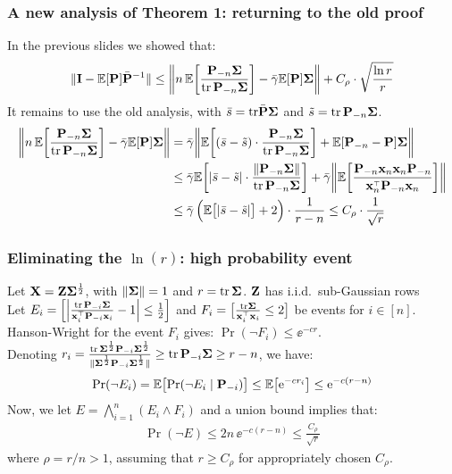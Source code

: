 \documentclass[10pt]{beamer}
\begin{document}
\begin{frame}
  \frametitle{A new analysis of Theorem 1: returning to the old proof}
  In the previous slides we showed that:
  \begin{align*}
    \|\mathbf I-\mathbb E[\mathbf P]\bar{\mathbf P}^{-1}\|\leq
    \bigg\|n\,\mathbb E\bigg[\frac{\mathbf P_{-n}\mathbf{\Sigma}}{\mathrm{tr}\,\mathbf P_{-n}\mathbf{\Sigma}}\bigg]
    - \bar\gamma\mathbb E[\mathbf P]\mathbf{\Sigma}\bigg\| + C_\rho\cdot \sqrt{\frac{\ln r}{r}}
  \end{align*}
  It remains to use the old analysis, with $\bar s=\mathrm{tr}\bar{\mathbf P}\mathbf{\Sigma}$
  and $\tilde s=\mathrm{tr}\,\mathbf P_{-n}\mathbf{\Sigma}$.
  \begin{align*}
   \bigg\| n\,\E\bigg[\frac{\P_{-n}\Sigmab}{\tr\,\P_{-n}\Sigmab}\bigg]
    - \bar\gamma\E[\P]\Sigmab\bigg\|
&=\bar\gamma\bigg\|\E\bigg[(\bar s - \tilde s)\cdot
\frac{\P_{-n}\Sigmab}{\tr\,\P_{-n}\Sigmab}\bigg]
+ \E[\P_{-n}-\P]\Sigmab\bigg\|\\
&\leq \bar\gamma \E\bigg[|\bar s-\tilde s|\cdot
\frac{\|\P_{-n}\Sigmab\|}{\tr\,\P_{-n}\Sigmab}\bigg]
+\bar\gamma\bigg\|\E\bigg[\frac{\P_{-n}\x_n\x_n\P_{-n}}{\x_n^\top\P_{-n}\x_n}\bigg]\bigg\|
    \\
    &\leq \bar\gamma\,\Big(\E\big[|\bar s-\tilde s|\big] + 2\Big)\cdot
      \frac1{r-n}\leq C_\rho\cdot \frac1{\sqrt r}
  \end{align*}
\end{frame}

  \begin{frame}
    \frametitle{Eliminating the $\ln(r)$: high probability event}
Let $\mathbf X = \mathbf Z\mathbf{\Sigma}^{\frac12}$, with $\|\mathbf{\Sigma}\|=1$ and
$r=\mathrm{tr}\,\mathbf{\Sigma}$. $\mathbf Z$ has i.i.d.~sub-Gaussian rows\\
    Let $E_i =
    \Big[\Big|\frac{\tr\,\P_{-i}\Sigmab}{\x_i^\top\P_{-i}\x_i}-1\Big|\leq\frac12\Big]$ and $F_i= \big[\frac{\tr\Sigmab}{\x_i^\top\x_i}\leq 2\big]$ be
    events for $i\in[n]$.\\
    Hanson-Wright for the event $F_i$ gives: $\Pr(\neg F_i)\leq
    \ee^{-c r}$.\\
Denoting
$r_i=\frac{\mathrm{tr}\,\mathbf{\Sigma}^{\frac12}\mathbf P_{-i}\mathbf{\Sigma}^{\frac12}}{\|\mathbf{\Sigma}^{\frac12}\mathbf P_{-i}\mathbf{\Sigma}^{\frac12}\|}\geq
\mathrm{tr}\,\mathbf P_{-i}\mathbf{\Sigma}\geq r-n$, 
we have:
\begin{align*}
\mathrm{Pr}(\neg E_i) = \mathbb E\big[\mathrm{Pr}(\neg E_i\mid \mathbf P_{-i})\big]\leq
  \mathbb E\big[\mathrm{e}^{-cr_i}\big]\leq \mathrm{e}^{-c(r-n)}
\end{align*}
Now, we let $E = \bigwedge_{i=1}^n(E_i \wedge F_i)$ and a union bound
implies that:
\begin{align*}
  \Pr(\neg E)\leq 2n\,\ee^{-c(r-n)}\leq  \frac{C_\rho}{\sqrt{r}}
\end{align*}
where $\rho = r/n>1$, assuming that $r\geq C_\rho$ for appropriately
chosen $C_\rho$.
  \end{frame}
\end{document}
